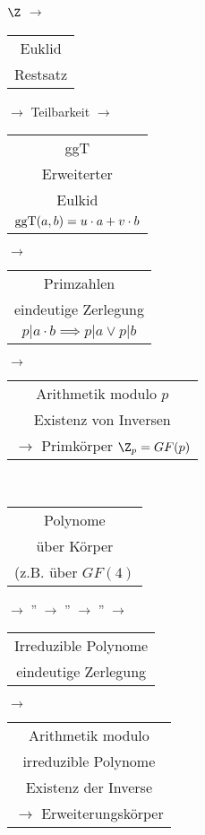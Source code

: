 $\Z$ $\rightarrow$ \begin{tabular}{c}Euklid\\Restsatz\end{tabular} $\rightarrow$ Teilbarkeit $\rightarrow$ \begin{tabular}{c}ggT\\Erweiterter\\Eulkid\\$\operatorname{ggT}(a,b) = u \cdot a + v \cdot b$\end{tabular} $\rightarrow$ \begin{tabular}{c}Primzahlen\\eindeutige Zerlegung\\$p | a \cdot b \implies p | a \vee p | b$\end{tabular} $\rightarrow$ \begin{tabular}{c}Arithmetik modulo $p$\\Existenz von Inversen\\$\rightarrow$ Primkörper $\Z_p = GF(p)$\end{tabular} \\
\begin{tabular}{c}Polynome\\über Körper\\(z.B. über $GF(4)$\end{tabular} $\rightarrow$ '' $\rightarrow$ '' $\rightarrow$ '' $\rightarrow$ \begin{tabular}{c}Irreduzible Polynome\\eindeutige Zerlegung\end{tabular} $\rightarrow$ \begin{tabular}{c}Arithmetik modulo\\irreduzible Polynome\\Existenz der Inverse\\$\rightarrow$ Erweiterungskörper\end{tabular}\\

